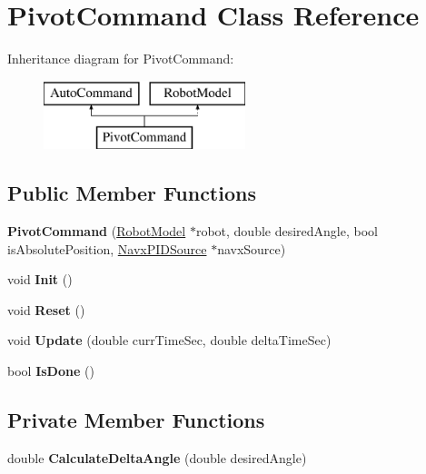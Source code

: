\hypertarget{class_pivot_command}{}\section{Pivot\+Command Class Reference}
\label{class_pivot_command}
Inheritance diagram for Pivot\+Command\+:\begin{figure}[H]
\begin{center}
\leavevmode
\includegraphics[height=2.000000cm]{class_pivot_command}
\end{center}
\end{figure}
\subsection*{Public Member Functions}
\begin{DoxyCompactItemize}
\item 
\mbox{\label{class_pivot_command_aeed6d5f91fade3124c4a66080edad50d}} 
{\bfseries Pivot\+Command} (\hyperlink{class_robot_model}{Robot\+Model} $\ast$robot, double desired\+Angle, bool is\+Absolute\+Position, \hyperlink{class_navx_p_i_d_source}{Navx\+P\+I\+D\+Source} $\ast$navx\+Source)
\item 
\mbox{\label{class_pivot_command_a4bc3497678e5fdc84e0ec545f87fcd2a}} 
void {\bfseries Init} ()
\item 
\mbox{\label{class_pivot_command_a728a96471b607920a8e3581b15c2a6ed}} 
void {\bfseries Reset} ()
\item 
\mbox{\label{class_pivot_command_ab43066cd70a708f342f53f94558acf98}} 
void {\bfseries Update} (double curr\+Time\+Sec, double delta\+Time\+Sec)
\item 
\mbox{\label{class_pivot_command_acc8ed3e6a76a19a05201131f0bd7ccc5}} 
bool {\bfseries Is\+Done} ()
\end{DoxyCompactItemize}
\subsection*{Private Member Functions}
\begin{DoxyCompactItemize}
\item 
\mbox{\label{class_pivot_command_a56f0c011b2a744f1ed0a2b5cb301cdb2}} 
double {\bfseries Calculate\+Delta\+Angle} (double desired\+Angle)
\end{DoxyCompactItemize}

